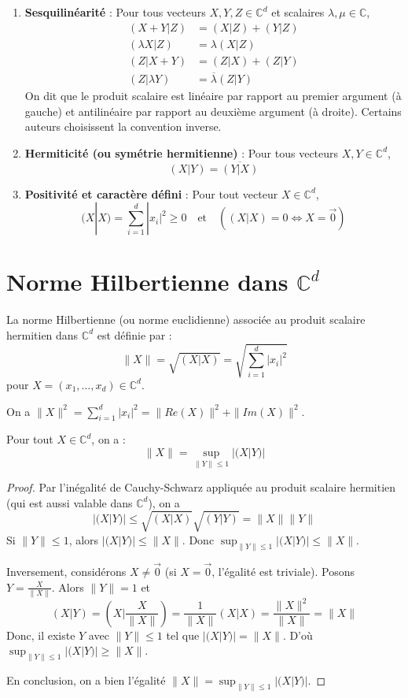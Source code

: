 \documentclass[oneside]{book}
\begin{document}
\begin{enumerate}
    \item \textbf{Sesquilinéarité} :
    Pour tous vecteurs $X, Y, Z \in \mathbb{C}^d$ et scalaires $\lambda, \mu \in \mathbb{C}$,
    \begin{align*}
        (X + Y|Z) &= (X|Z) + (Y|Z) \\
        (\lambda X|Z) &= \lambda (X|Z) \\
        (Z|X + Y) &= (Z|X) + (Z|Y) \\
        (Z|\lambda Y) &= \overline{\lambda} (Z|Y)
    \end{align*}
    On dit que le produit scalaire est linéaire par rapport au premier argument (à gauche) et antilinéaire par rapport au deuxième argument (à droite). Certains auteurs choisissent la convention inverse.

    \item \textbf{Hermiticité (ou symétrie hermitienne)} :
    Pour tous vecteurs $X, Y \in \mathbb{C}^d$,
    \[
    (X|Y) = \overline{(Y|X)}
    \]

    \item \textbf{Positivité et caractère défini} :
    Pour tout vecteur $X \in \mathbb{C}^d$,
    \[
    (X|X) = \sum_{i=1}^d |x_i|^2 \geq 0 \quad \text{et} \quad ((X|X) = 0 \iff X = \overrightarrow{0})
    \]
\end{enumerate}


\section{Norme Hilbertienne dans $\mathbb{C}^d$}

\begin{definition}
La norme Hilbertienne (ou norme euclidienne) associée au produit scalaire hermitien dans $\mathbb{C}^d$ est définie par :
\[
\|X\| = \sqrt{(X|X)} = \sqrt{\sum_{i=1}^d |x_i|^2}
\]
pour $X = (x_1, \ldots, x_d) \in \mathbb{C}^d$.
\end{definition}
On a $\|X\|^2 = \sum_{i=1}^d |x_i|^2 = \|Re(X)\|^2 + \|Im(X)\|^2$.

\begin{lemma}
Pour tout $X \in \mathbb{C}^d$, on a :
\[
\|X\| = \sup_{\|Y\| \leq 1} |(X|Y)|
\]
\end{lemma}

\begin{proof}
Par l'inégalité de Cauchy-Schwarz appliquée au produit scalaire hermitien (qui est aussi valable dans $\mathbb{C}^d$), on a
\[
|(X|Y)| \leq \sqrt{(X|X)} \sqrt{(Y|Y)} = \|X\| \|Y\|
\]
Si $\|Y\| \leq 1$, alors $|(X|Y)| \leq \|X\|$. Donc $\sup_{\|Y\| \leq 1} |(X|Y)| \leq \|X\|$.

Inversement, considérons $X \neq \overrightarrow{0}$ (si $X = \overrightarrow{0}$, l'égalité est triviale). Posons $Y = \frac{X}{\|X\|}$. Alors $\|Y\| = 1$ et
\[
(X|Y) = \left(X \Big| \frac{X}{\|X\|} \right) = \frac{1}{\|X\|} (X|X) = \frac{\|X\|^2}{\|X\|} = \|X\|
\]
Donc, il existe $Y$ avec $\|Y\| \leq 1$ tel que $|(X|Y)| = \|X\|$. D'où $\sup_{\|Y\| \leq 1} |(X|Y)| \geq \|X\|$.

En conclusion, on a bien l'égalité $\|X\| = \sup_{\|Y\| \leq 1} |(X|Y)|$.
\end{proof}
\end{document}
